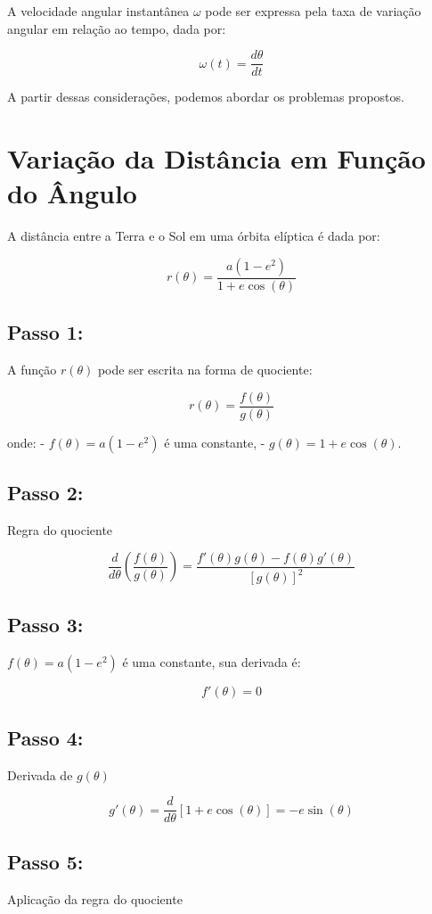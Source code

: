 \documentclass[portuguese,12pt,a4paper,onecolumn]{article}
\begin{document}
	A velocidade angular instantânea \( \omega \) pode ser expressa pela taxa de variação angular em relação ao tempo, dada por:
	
	\[
	\omega(t) = \frac{d\theta}{dt}
	\]
	
	A partir dessas considerações, podemos abordar os problemas propostos.
	
	\section{Variação da Distância em Função do Ângulo}
	
	A distância entre a Terra e o Sol em uma órbita elíptica é dada por:
	
	\[
	r(\theta) = \frac{a(1 - e^2)}{1 + e \cos(\theta)}
	\]
	
	\subsection{Passo 1:} A função \( r(\theta) \) pode ser escrita na forma de quociente:
	
	\[
	r(\theta) = \frac{f(\theta)}{g(\theta)}
	\]
	
	onde:
	- \( f(\theta) = a(1 - e^2) \) é uma constante,
	- \( g(\theta) = 1 + e \cos(\theta) \).
	
	\subsection{Passo 2:} Regra do quociente
	
	\[
	\frac{d}{d\theta} \left( \frac{f(\theta)}{g(\theta)} \right) = \frac{f'(\theta)g(\theta) - f(\theta)g'(\theta)}{[g(\theta)]^2}
	\]
	
	\subsection{Passo 3:} \( f(\theta) = a(1 - e^2) \) é uma constante, sua derivada é:
	
	\[
	f'(\theta) = 0
	\]
	
	\subsection{Passo 4:} Derivada de \( g(\theta) \)
	
	\[
	g'(\theta) = \frac{d}{d\theta} [1 + e \cos(\theta)] = -e \sin(\theta)
	\]
	
	\subsection{Passo 5:} Aplicação da regra do quociente
	
\end{document}

